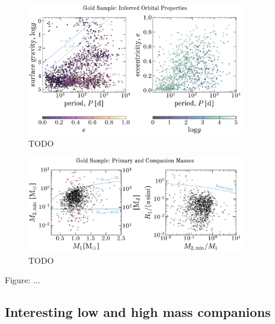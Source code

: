 \documentclass[modern]{aastex63}
\begin{document}
\begin{figure}[!t]
    \begin{center}
    \includegraphics[width=0.85\textwidth]{Plogg_Pe.pdf}
    \end{center}
    \caption{%
    TODO
    \label{fig:Plogg}
    }
\end{figure}


\begin{figure}[!t]
    \begin{center}
    \includegraphics[width=0.85\textwidth]{m2_m1_roche.pdf}
    \end{center}
    \caption{%
    TODO
    \label{fig:m2m1}
    }
\end{figure}


Figure: ...


\subsection{Interesting low and high mass companions}
\end{document}
